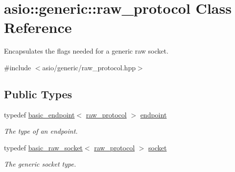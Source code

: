 \hypertarget{classasio_1_1generic_1_1raw__protocol}{}\section{asio\+:\+:generic\+:\+:raw\+\_\+protocol Class Reference}
\label{classasio_1_1generic_1_1raw__protocol}


Encapsulates the flags needed for a generic raw socket.  




{\ttfamily \#include $<$asio/generic/raw\+\_\+protocol.\+hpp$>$}

\subsection*{Public Types}
\begin{DoxyCompactItemize}
\item 
typedef \hyperlink{classasio_1_1generic_1_1basic__endpoint}{basic\+\_\+endpoint}$<$ \hyperlink{classasio_1_1generic_1_1raw__protocol}{raw\+\_\+protocol} $>$ \hyperlink{classasio_1_1generic_1_1raw__protocol_acf929033057209f9611472f4f23fd843}{endpoint}
\begin{DoxyCompactList}\small\item\em The type of an endpoint. \end{DoxyCompactList}\item 
typedef \hyperlink{classasio_1_1basic__raw__socket}{basic\+\_\+raw\+\_\+socket}$<$ \hyperlink{classasio_1_1generic_1_1raw__protocol}{raw\+\_\+protocol} $>$ \hyperlink{classasio_1_1generic_1_1raw__protocol_a9b6f99280e2965256061041b5bf465c6}{socket}
\begin{DoxyCompactList}\small\item\em The generic socket type. \end{DoxyCompactList}\end{DoxyCompactItemize}
